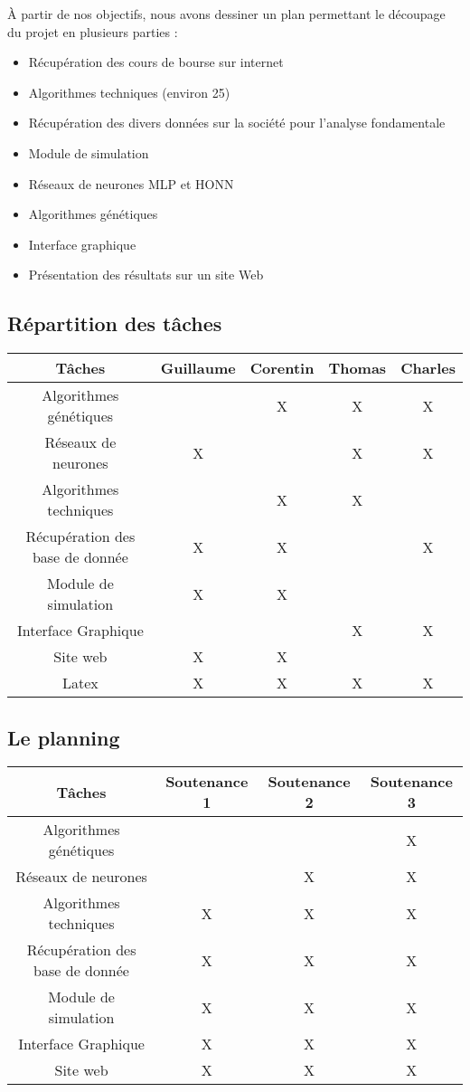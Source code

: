 \documentclass[a4paper,12pt]{article}
\begin{document}
À partir de nos objectifs, nous avons dessiner un plan permettant le découpage du projet en plusieurs parties : 

\begin{itemize}
\item Récupération des cours de bourse sur internet
\item Algorithmes techniques (environ 25)
\item Récupération des divers données sur la société pour l'analyse fondamentale
\item Module de simulation
\item Réseaux de neurones MLP et HONN
\item Algorithmes génétiques
\item Interface graphique
\item Présentation des résultats sur un site Web
\end{itemize}

\subsection{Répartition des tâches}
\begin{tabular}{|c||c|c|c|c|}
\hline
Tâches & Guillaume & Corentin & Thomas & Charles\\
\hline
Algorithmes génétiques & & X & X & X \\
\hline
Réseaux de neurones & X & & X & X \\
\hline
Algorithmes techniques & & X & X & \\
\hline
Récupération des base de donnée & X & X & & X \\
\hline
Module de simulation & X & X & & \\
\hline
Interface Graphique & & & X & X \\
\hline
Site web & X & X & &\\
\hline
Latex & X & X & X & X \\
\hline 
\end{tabular}

\subsection{Le planning}
\begin{tabular}{|c||c|c|c|}
\hline
Tâches & Soutenance 1 & Soutenance 2 & Soutenance 3\\
\hline
Algorithmes génétiques & & & X \\
\hline
Réseaux de neurones & & X & X \\
\hline
Algorithmes techniques & X & X & X \\
\hline
Récupération des base de donnée & X & X & X\\
\hline
Module de simulation & X & X & X \\
\hline
Interface Graphique & X & X & X \\
\hline
Site web & X & X & X\\
\hline
\end{tabular}
\end{document}
